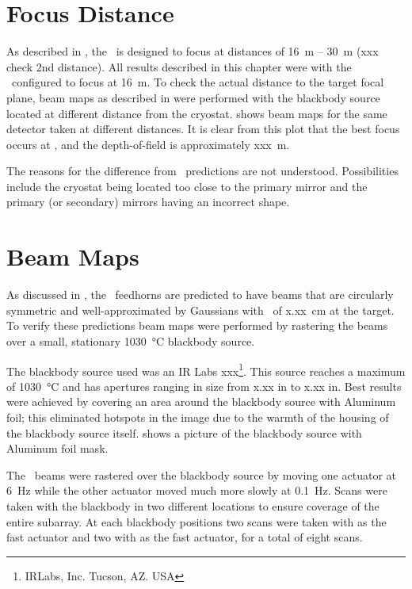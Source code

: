 \section{Focus Distance}\label{s:focus-distance}

As described in , the \Imager\ is designed to focus at distances of 16~m -- 30~m (xxx check 2nd distance).
All results described in this chapter were with the \Imager\ configured to focus at 16~m.
To check the actual distance to the target focal plane, beam maps as described in  were performed with the blackbody source located at different distance from the cryostat.
 shows beam maps for the same detector taken at different distances.
It is clear from this plot that the best focus occurs at , and the depth-of-field is approximately xxx~m.

The reasons for the difference from \ZEMAX\ predictions are not understood.
Possibilities include the cryostat being located too close to the primary mirror and the primary (or secondary) mirrors having an incorrect shape.

\section{Beam Maps} \label{sec:ch8-beam-maps}

As discussed in , the \Imager\ feedhorns are predicted to have beams that are circularly symmetric and well-approximated by Gaussians with \FWHM\ of x.xx~cm at the target.
To verify these predictions beam maps were performed by rastering the beams over a small, stationary \SI{1030}{\celsius} blackbody source.

The blackbody source used was an IR Labs xxx\footnote{IRLabs, Inc. Tucson, AZ. USA}.
This source reaches a maximum of \SI{1030}{\celsius} and has apertures ranging in size from x.xx in to x.xx in.
Best results were achieved by covering an area around the blackbody source with Aluminum foil; this eliminated hotspots in the image due to the warmth of the housing of the blackbody source itself.
 shows a picture of the blackbody source with Aluminum foil mask.

The \Imager\ beams were rastered over the blackbody source by moving one actuator at \SI{6}{\hertz} while the other actuator moved much more slowly at \SI{0.1}{\hertz}.
Scans were taken with the blackbody in two different locations to ensure coverage of the entire subarray.
At each blackbody positions two scans were taken with  as the fast actuator and two with  as the fast actuator, for a total of eight scans.


